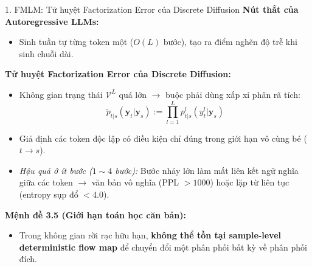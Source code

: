 \begin{frame}{1. FMLM: Tử huyệt Factorization Error của Discrete Diffusion}
    \textbf{Nút thắt của Autoregressive LLMs:}
    \begin{itemize}
        \item Sinh tuần tự từng token một ($O(L)$ bước), tạo ra điểm nghẽn độ trễ khi sinh chuỗi dài.
    \end{itemize}
    \vspace{0.2cm}
    \textbf{Tử huyệt Factorization Error của Discrete Diffusion:}
    \begin{itemize}
        \item Không gian trạng thái $\mathcal{V}^L$ quá lớn $\rightarrow$ buộc phải dùng xấp xỉ phân rã tích:
        $$\tilde{p}_{t|s}(\mathbf{y}_t | \mathbf{y}_s) := \prod_{l=1}^L p^l_{t|s}(y_t^l | \mathbf{y}_s)$$
        \item Giả định các token độc lập có điều kiện chỉ đúng trong giới hạn vô cùng bé ($t \to s$).
        \item \textit{Hậu quả ở ít bước ($1 \sim 4$ bước):} Bước nhảy lớn làm mất liên kết ngữ nghĩa giữa các token $\rightarrow$ văn bản vô nghĩa (PPL $> 1000$) hoặc lặp từ liên tục (entropy sụp đổ $< 4.0$).
    \end{itemize}
    \vspace{0.2cm}
    \textbf{Mệnh đề 3.5 (Giới hạn toán học căn bản):}
    \begin{itemize}
        \item Trong không gian rời rạc hữu hạn, \textbf{không thể tồn tại sample-level deterministic flow map} để chuyển đổi một phân phối bất kỳ về phân phối đích.
    \end{itemize}
\end{frame}

